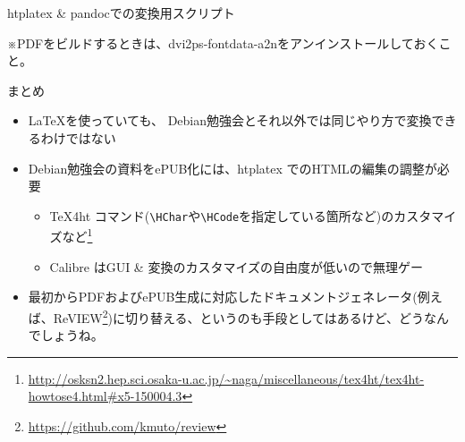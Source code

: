 \begin{frame}[containsverbatim]{htplatex \& pandocでの変換用スクリプト}
※PDFをビルドするときは、dvi2ps-fontdata-a2nをアンインストールしておくこと。
\end{frame}

\begin{frame}{まとめ}
\begin{itemize}
  \item \LaTeX を使っていても、 Debian勉強会とそれ以外では同じやり方で変換できるわけではない
  \item Debian勉強会の資料をePUB化には、htplatex でのHTMLの編集の調整が必要
    \begin{itemize}
    \item \TeX 4ht コマンド(\texttt{\textbackslash HChar}や\texttt{\textbackslash HCode}を指定している箇所など)のカスタマイズなど\footnote{\url{http://osksn2.hep.sci.osaka-u.ac.jp/~naga/miscellaneous/tex4ht/tex4ht-howtose4.html\#x5-150004.3}}
    \item Calibre はGUI \& 変換のカスタマイズの自由度が低いので無理ゲー
    \end{itemize}
  \item 最初からPDFおよびePUB生成に対応したドキュメントジェネレータ(例えば、ReVIEW\footnote{\url{https://github.com/kmuto/review}})に切り替える、というのも手段としてはあるけど、どうなんでしょうね。
\end{itemize}
\end{frame}


